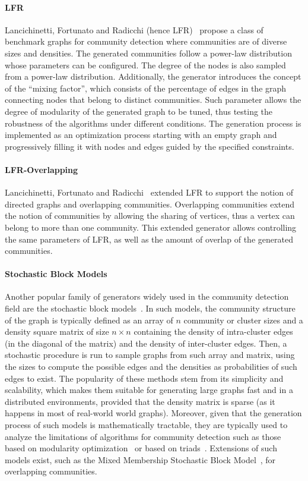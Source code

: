 \paragraph{LFR} Lancichinetti, Fortunato
and Radicchi (hence LFR)~\cite{PhysRevE.78.046110} propose a class of benchmark
graphs for community detection where communities are of diverse sizes and
densities. The generated communities follow a power-law distribution whose parameters can be configured. The degree of the
nodes is also sampled from a power-law distribution. Additionally, the generator
introduces the concept of the ``mixing factor'', which consists of the percentage of
edges in the graph connecting nodes that belong to distinct communities. Such parameter
allows  the degree of modularity of the generated graph  to be tuned, thus
testing the robustness of the algorithms under different conditions. The
generation process is implemented as an optimization process starting with an empty graph and
progressively filling it with nodes and edges guided by the specified constraints.

\paragraph{LFR-Overlapping} Lancichinetti, Fortunato and
Radicchi~\cite{PhysRevE.80.016118} extended LFR to support the notion of
directed graphs and overlapping communities. Overlapping communities extend the
notion of communities by allowing the sharing of vertices, thus a vertex can
belong to more than one community. This extended generator allows controlling
the same parameters of LFR, as well as the amount of overlap of
the generated communities.

\paragraph{Stochastic Block Models} Another popular family of generators
widely used in the community detection field are the stochastic block
models~\cite{holland1983stochastic}. In such models, the community structure of
the graph is typically defined as an array of $n$ community or cluster sizes
and a density square matrix of size $n \times n$ containing the density of
intra-cluster edges (in the diagonal of the matrix) and the density of
inter-cluster edges. Then, a stochastic procedure is run to sample graphs
from such array and matrix, using the sizes to compute the possible edges
and the densities as probabilities of such edges to exist. The popularity of
these methods stem from its simplicity and scalability, which makes them
suitable for generating large graphs fast and in a distributed environments,
provided that the density matrix is sparse (as it happens in most of real-world
                                            world graphs). Moreover, given
that the generation process of such models is mathematically tractable, they
are typically used to analyze the limitations of algorithms for community detection
 such as those based on modularity
optimization~\cite{fortunato2007resolution} or based on
triads~\cite{prat2016put}. Extensions of such models exist, such as the
Mixed Membership Stochastic Block Model~\cite{airoldi2008mixed}, for
overlapping communities.

